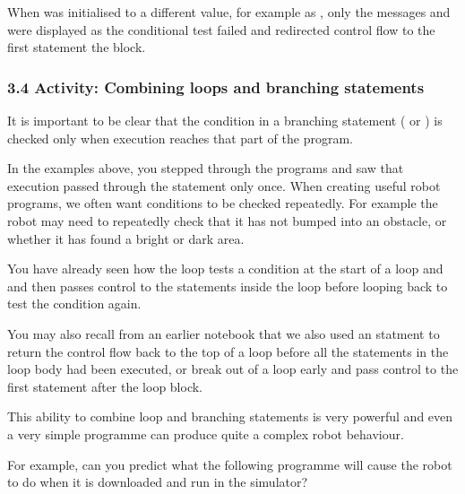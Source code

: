 \documentclass[letterpaper,10pt,english]{sphinxmanual}
\begin{document}
When  was initialised to a different value, for example as , only the messages  and  were displayed as the  conditional test failed and redirected control flow to the first statement  the  block.


\subsubsection{3.4 Activity: Combining loops and branching statements}
\label{\detokenize{content/02_Robot_Lab/Section_00_02:3.4-Activity:-Combining-loops-and-branching-statements}}
It is important to be clear that the condition in a branching statement ( or ) is checked only when execution reaches that part of the program.

In the examples above, you stepped through the programs and saw that execution passed through the  statement only once. When creating useful robot programs, we often want conditions to be checked repeatedly. For example the robot may need to repeatedly check that it has not bumped into an obstacle, or whether it has found a bright or dark area.

You have already seen how the  loop tests a condition at the start of a loop and and then passes control to the statements inside the loop before looping back to test the  condition again.

You may also recall from an earlier notebook that we also used an  statment to return the control flow back to the top of a loop before all the statements in the loop body had been executed, or break out of a loop early and pass control to the first statement after the loop block.

This ability to combine loop and branching statements is very powerful and even a very simple programme can produce quite a complex robot behaviour.

For example, can you predict what the following programme will cause the robot to do when it is downloaded and run in the simulator?

\end{document}
